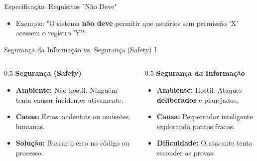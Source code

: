 \documentclass[aspectratio=169]{beamer}
\begin{document}
\begin{frame}{Especificação: Requisitos "Não Deve"}
    \centering
    \vspace{0.5cm}
    \begin{itemize}
        \item Exemplo: "O sistema \textbf{não deve} permitir que usuários sem permissão 'X' acessem o registro 'Y'".
    \end{itemize}
\end{frame}

\begin{frame}{Segurança da Informação vs. Segurança (Safety) I}
    \begin{columns}
        \begin{column}{0.5\textwidth}
            \centering
            \textbf{Segurança (Safety)}
            \begin{itemize}
                \item \textbf{Ambiente:} Não hostil. Ninguém tenta causar incidentes ativamente.
                \item \textbf{Causa:} Erros acidentais ou omissões humanas.
                \item \textbf{Solução:} Buscar o erro no código ou processo.
            \end{itemize}
        \end{column}
        \begin{column}{0.5\textwidth}
            \centering
            \textbf{Segurança da Informação}
            \begin{itemize}
                \item \textbf{Ambiente:} Hostil. Ataques \textbf{deliberados} e planejados.
                \item \textbf{Causa:} Perpetrador inteligente explorando pontos fracos.
                \item \textbf{Dificuldade:} O atacante tenta esconder as provas.
            \end{itemize}
        \end{column}
    \end{columns}
\end{frame}
\end{document}
